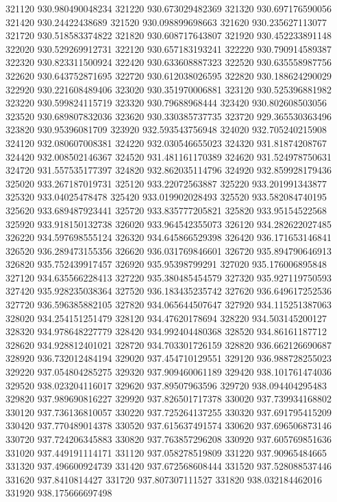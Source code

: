 {321120 930.980490048234
321220 930.673029482369
321320 930.697176590056
321420 930.24422438689
321520 930.098899698663
321620 930.235627113077
321720 930.518583374822
321820 930.608717643807
321920 930.452233891148
322020 930.529269912731
322120 930.657183193241
322220 930.790914589387
322320 930.823311500924
322420 930.633608887323
322520 930.635558987756
322620 930.643752871695
322720 930.612038026595
322820 930.188624290029
322920 930.221608489406
323020 930.351970006881
323120 930.525396881982
323220 930.599824115719
323320 930.79688968444
323420 930.802608503056
323520 930.689807832036
323620 930.330385737735
323720 929.365530363496
323820 930.95396081709
323920 932.593543756948
324020 932.705240215908
324120 932.080607008381
324220 932.030546655023
324320 931.81874208767
324420 932.008502146367
324520 931.481161170389
324620 931.524978750631
324720 931.557535177397
324820 932.862035114796
324920 932.859928179436
325020 933.267187019731
325120 933.22072563887
325220 933.201991343877
325320 933.04025478478
325420 933.019902028493
325520 933.582084740195
325620 933.689487923441
325720 933.835777205821
325820 933.95154522568
325920 933.918150132738
326020 933.964542355073
326120 934.282622027485
326220 934.597698555124
326320 934.645866529398
326420 936.171653146841
326520 936.289473155356
326620 936.031769846601
326720 935.894790646913
326820 935.752439917457
326920 935.95398799291
327020 935.176006895848
327120 934.635566228413
327220 935.380485454579
327320 935.927119750593
327420 935.928235038364
327520 936.183435235742
327620 936.649617252536
327720 936.596385882105
327820 934.065644507647
327920 934.115251387063
328020 934.254151251479
328120 934.47620178694
328220 934.503145200127
328320 934.978648227779
328420 934.992404480368
328520 934.86161187712
328620 934.928812401021
328720 934.703301726159
328820 936.662126690687
328920 936.732012484194
329020 937.454710129551
329120 936.988728255023
329220 937.054804285275
329320 937.909460061189
329420 938.101761474036
329520 938.023204116017
329620 937.89507963596
329720 938.094404295483
329820 937.989690816227
329920 937.826501717378
330020 937.739934168802
330120 937.736136810057
330220 937.725264137255
330320 937.691795415209
330420 937.770489014378
330520 937.615637491574
330620 937.696506873146
330720 937.724206345883
330820 937.763857296208
330920 937.605769851636
331020 937.449191114171
331120 937.058278519809
331220 937.90965484665
331320 937.496600924739
331420 937.672568608444
331520 937.528088537446
331620 937.8410814427
331720 937.807307111527
331820 938.032184462016
331920 938.175666697498
}
